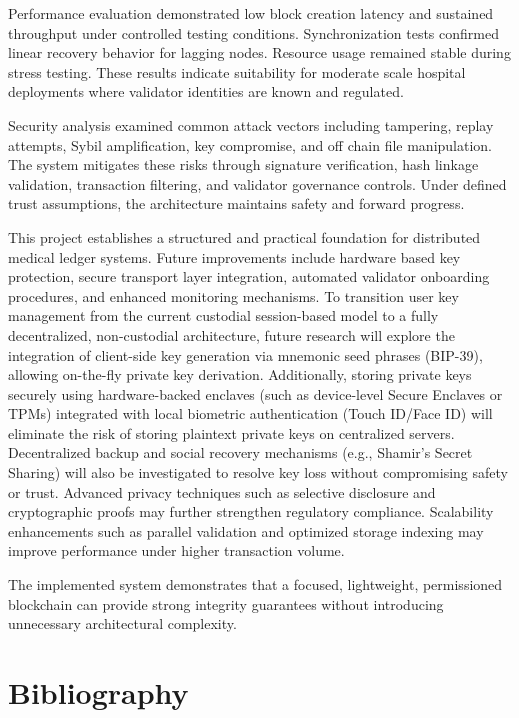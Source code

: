 Performance evaluation demonstrated low block creation latency and sustained throughput under controlled testing conditions. Synchronization tests confirmed linear recovery behavior for lagging nodes. Resource usage remained stable during stress testing. These results indicate suitability for moderate scale hospital deployments where validator identities are known and regulated.

Security analysis examined common attack vectors including tampering, replay attempts, Sybil amplification, key compromise, and off chain file manipulation. The system mitigates these risks through signature verification, hash linkage validation, transaction filtering, and validator governance controls. Under defined trust assumptions, the architecture maintains safety and forward progress.

This project establishes a structured and practical foundation for distributed medical ledger systems. Future improvements include hardware based key protection, secure transport layer integration, automated validator onboarding procedures, and enhanced monitoring mechanisms. To transition user key management from the current custodial session-based model to a fully decentralized, non-custodial architecture, future research will explore the integration of client-side key generation via mnemonic seed phrases (BIP-39), allowing on-the-fly private key derivation. Additionally, storing private keys securely using hardware-backed enclaves (such as device-level Secure Enclaves or TPMs) integrated with local biometric authentication (Touch ID/Face ID) will eliminate the risk of storing plaintext private keys on centralized servers. Decentralized backup and social recovery mechanisms (e.g., Shamir's Secret Sharing) will also be investigated to resolve key loss without compromising safety or trust. Advanced privacy techniques such as selective disclosure and cryptographic proofs may further strengthen regulatory compliance. Scalability enhancements such as parallel validation and optimized storage indexing may improve performance under higher transaction volume.

The implemented system demonstrates that a focused, lightweight, permissioned blockchain can provide strong integrity guarantees without introducing unnecessary architectural complexity.

\newpage
\section*{Bibliography}
\label{sec:bibliography}

